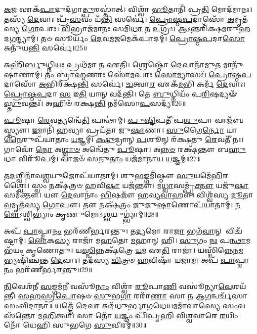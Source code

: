 \-\ul{𑌅}\-𑌜 𑌏𑌕᳴\-\ul{𑌪𑌾}\-𑌦𑍁𑌦᳴𑌗𑌾\-\ul{𑌤𑍍𑌪𑍁}\-𑌰𑌸𑍍𑌤𑌾॑𑌤𑍍। 
𑌵𑌿𑌶𑍍𑌵𑌾᳴ \ul{𑌭𑍂}\-𑌤𑌾𑌨𑌿᳴ 𑌪𑍍𑌰\-\ul{𑌤𑌿} 𑌮𑍋𑌦᳴𑌮𑌾𑌨𑌃। 
𑌤𑌸𑍍𑌯᳴ \ul{𑌦𑍇}\-𑌵𑌾𑌃 𑌪𑍍𑌰᳴\-\ul{𑌸}\-𑌵𑌂 𑌯᳴\-\ul{𑌨𑍍𑌤𑌿} 𑌸𑌰𑍍𑌵𑍇॑। 
\-\ul{𑌪𑍍𑌰𑍋}\-\-\ul{𑌷𑍍𑌠}\-\-\ul{𑌪}\-𑌦𑌾𑌸𑍋᳴ \ul{𑌅}\-𑌮𑍃𑌤᳴𑌸𑍍𑌯 \ul{𑌗𑍋}\-𑌪𑌾𑌃। 
\-\ul{𑌵𑌿}\-𑌭𑍍𑌰𑌾𑌜᳴𑌮𑌾𑌨𑌃 𑌸𑌮𑌿\-\ul{𑌧𑌾} 𑌨 \ul{𑌉}\-𑌗𑍍𑌰𑌃। 
𑌆𑌽𑌨𑍍𑌤𑌰𑌿᳴𑌕𑍍𑌷𑌮𑌰𑍁\-\ul{𑌹}\-𑌦\-\ul{𑌗}\-𑌨𑍍𑌦𑍍𑌯𑌾𑌮𑍍। 
𑌤𑍞 𑌸𑍂𑌰𑍍𑌯𑌂᳴ \ul{𑌦𑍇}\-𑌵\-\ul{𑌮}\-𑌜𑌮𑍇𑌕᳴𑌪𑌾𑌦𑌮𑍍। 
\-\ul{𑌪𑍍𑌰𑍋}\-\-\ul{𑌷𑍍𑌠}\-\-\ul{𑌪}\-𑌦𑌾\-\ul{𑌸𑍋} 𑌅𑌨𑍁᳴𑌯\-\ul{𑌨𑍍𑌤𑌿} 𑌸𑌰𑍍𑌵𑍇॑॥25॥ 

𑌅𑌹𑌿᳴\-\ul{𑌰𑍍𑌬𑍁}\-𑌧𑍍𑌨𑌿\-\ul{𑌯𑌃} 𑌪𑍍𑌰𑌥᳴𑌮𑌾 𑌨 𑌏𑌤𑌿। 
𑌶𑍍𑌰𑍇𑌷𑍍𑌠𑍋᳴ \ul{𑌦𑍇}\-𑌵𑌾𑌨𑌾᳴\-\ul{𑌮𑍁}\-𑌤 𑌮𑌾𑌨𑍁᳴𑌷𑌾𑌣𑌾𑌮𑍍। 
𑌤𑌂 𑌬𑍍𑌰𑌾॑\-\ul{𑌹𑍍𑌮}\-𑌣𑌾𑌃 𑌸𑍋᳴\-\ul{𑌮}\-𑌪𑌾𑌃 \ul{𑌸𑍋}\-𑌮𑍍𑌯𑌾𑌸𑌃᳴। 
\-\ul{𑌪𑍍𑌰𑍋}\-\-\ul{𑌷𑍍𑌠}\-\-\ul{𑌪}\-𑌦𑌾𑌸𑍋᳴ \ul{𑌅}\-𑌭𑌿𑌰᳴𑌕𑍍𑌷\-\ul{𑌨𑍍𑌤𑌿} 𑌸𑌰𑍍𑌵𑍇॑। 
\-\ul{𑌚}\-𑌤𑍍𑌵𑌾\-\ul{𑌰} 𑌏𑌕᳴\-\ul{𑌮}\-𑌭𑌿 𑌕𑌰𑍍𑌮᳴ \ul{𑌦𑍇}\-𑌵𑌾𑌃। 
\-\ul{𑌪𑍍𑌰𑍋}\-\-\ul{𑌷𑍍𑌠}\-\-\ul{𑌪}\-𑌦𑌾 \ul{𑌸} 𑌇\-\ul{𑌤𑌿} 𑌯𑌾𑌨𑍍 𑌵𑌦᳴𑌨𑍍𑌤𑌿। 
𑌤𑍇 \ul{𑌬𑍁}\-𑌧𑍍𑌨𑌿𑌯𑌂᳴ 𑌪\-\ul{𑌰𑌿}\-𑌷𑌦𑍍𑌯𑍟᳴ \ul{𑌸𑍍𑌤𑍁}\-𑌵𑌨𑍍𑌤𑌃᳴। 
𑌅𑌹𑌿𑍞᳴ 𑌰𑌕𑍍𑌷\-\ul{𑌨𑍍𑌤𑌿} 𑌨𑌮᳴𑌸𑍋\-\ul{𑌪}\-𑌸𑌦𑍍𑌯᳴॥26॥ 

\-\ul{𑌪𑍂}\-𑌷𑌾 \ul{𑌰𑍇}\-𑌵𑌤𑍍𑌯𑌨𑍍𑌵𑍇᳴\-\ul{𑌤𑌿} 𑌪𑌨𑍍𑌥𑌾॑𑌮𑍍। 
\-\ul{𑌪𑍁}\-\-\ul{𑌷𑍍𑌟𑌿}\-𑌪𑌤𑍀᳴ 𑌪\-\ul{𑌶𑍁}\-𑌪𑌾 𑌵𑌾𑌜᳴𑌬𑌸𑍍𑌤𑍍𑌯𑍗। 
\-\ul{𑌇}\-𑌮𑌾𑌨𑌿᳴ \ul{𑌹}\-𑌵𑍍𑌯𑌾 𑌪𑍍𑌰𑌯᳴𑌤𑌾 𑌜𑍁\-\ul{𑌷𑌾}\-𑌣𑌾। 
\-\ul{𑌸𑍁}\-𑌗𑍈\-\ul{𑌰𑍍𑌨𑍋} 𑌯𑌾\-\ul{𑌨𑍈}\-𑌰𑍁𑌪᳴𑌯𑌾𑌤𑌾𑌂 \ul{𑌯}\-𑌜𑍍𑌞𑌮𑍍। 
\-\ul{𑌕𑍍𑌷𑍁}\-𑌦𑍍𑌰𑌾𑌨𑍍 \ul{𑌪}\-𑌶𑍂𑌨𑍍 𑌰᳴𑌕𑍍𑌷𑌤𑍁 \ul{𑌰𑍇}\-𑌵𑌤𑍀᳴ 𑌨𑌃। 
𑌗𑌾𑌵𑍋᳴ \ul{𑌨𑍋} 𑌅\-\ul{𑌶𑍍𑌵𑌾}\-\-\ul{𑍞} 𑌅𑌨𑍍𑌵𑍇᳴𑌤𑍁 \ul{𑌪𑍂}\-𑌷𑌾। 
𑌅\-\ul{𑌨𑍍𑌨}\-\-\ul{𑍞} 𑌰𑌕𑍍𑌷᳴𑌨𑍍𑌤𑍗 𑌬\-\ul{𑌹𑍁}\-𑌧𑌾 𑌵𑌿𑌰𑍂᳴𑌪𑌮𑍍। 
𑌵𑌾𑌜𑍞᳴ 𑌸𑌨𑍁\-\ul{𑌤𑌾𑌂} 𑌯𑌜᳴𑌮𑌾𑌨𑌾𑌯 \ul{𑌯}\-𑌜𑍍𑌞𑌮𑍍॥27॥ 

𑌤\-\ul{𑌦}\-𑌶𑍍𑌵𑌿𑌨𑌾᳴𑌵\-\ul{𑌶𑍍𑌵}\-𑌯𑍁𑌜𑍋𑌪᳴𑌯𑌾𑌤𑌾𑌮𑍍। 
𑌶𑍁\-\ul{𑌭}\-𑌙𑍍𑌗𑌮𑌿᳴𑌷𑍍𑌠𑍗 \ul{𑌸𑍁}\-𑌯𑌮𑍇᳴\-\ul{𑌭𑌿}\-𑌰𑌶𑍍𑌵𑍈𑌃॑। 
𑌸𑍍𑌵𑌂 𑌨𑌕𑍍𑌷᳴𑌤𑍍𑌰𑍞 \ul{𑌹}\-𑌵𑌿\-\ul{𑌷𑌾} 𑌯𑌜᳴𑌨𑍍𑌤𑍗। 
𑌮\-\ul{𑌧𑍍𑌵𑌾}\-𑌸𑌮𑍍𑌪𑍃᳴\-\ul{𑌕𑍍𑌤𑍗} 𑌯𑌜𑍁᳴\-\ul{𑌷𑌾} 𑌸𑌮᳴𑌕𑍍𑌤𑍗। 
𑌯𑍗 \ul{𑌦𑍇}\-𑌵𑌾𑌨𑌾𑌂॑ \ul{𑌭𑌿}\-𑌷𑌜𑍗᳴ 𑌹𑌵𑍍𑌯\-\ul{𑌵𑌾}\-𑌹𑍗। 
𑌵𑌿𑌶𑍍𑌵᳴𑌸𑍍𑌯 \ul{𑌦𑍂}\-𑌤𑌾\-\ul{𑌵}\-𑌮𑍃𑌤᳴𑌸𑍍𑌯 \ul{𑌗𑍋}\-𑌪𑍗। 
𑌤𑍗 𑌨𑌕𑍍𑌷᳴𑌤𑍍𑌰𑌂 𑌜𑍁𑌜𑍁\-\ul{𑌷𑌾}\-𑌣𑍋𑌪᳴𑌯𑌾𑌤𑌾𑌮𑍍। 
𑌨\-\ul{𑌮𑍋}\-𑌽𑌶𑍍𑌵𑌿𑌭𑍍𑌯𑌾𑌂॑ 𑌕𑍃𑌣𑍁𑌮𑍋𑌽\-\ul{𑌶𑍍𑌵}\-𑌯𑍁𑌗𑍍𑌭𑍍𑌯𑌾॑𑌮𑍍॥28॥ 

𑌅𑌪᳴ \ul{𑌪𑌾}\-𑌪𑍍𑌮𑌾\-\ul{𑌨𑌂} 𑌭𑌰᳴𑌣𑍀𑌰𑍍𑌭𑌰𑌨𑍍𑌤𑍁। 
𑌤\-\ul{𑌦𑍍𑌯}\-𑌮𑍋 𑌰𑌾\-\ul{𑌜𑌾} 𑌭𑌗᳴\-\ul{𑌵𑌾}\-𑌨𑍍 𑌵𑌿𑌚᳴𑌷𑍍𑌟𑌾𑌮𑍍। 
\-\ul{𑌲𑍋}\-𑌕\-\ul{𑌸𑍍𑌯} 𑌰𑌾𑌜𑌾᳴ 𑌮\-\ul{𑌹}\-𑌤𑍋 \ul{𑌮}\-𑌹𑌾𑌨𑍍 𑌹𑌿। 
\-\ul{𑌸𑍁}\-𑌗𑌂 \ul{𑌨𑌃} 𑌪\-\ul{𑌨𑍍𑌥𑌾}\-𑌮𑌭᳴𑌯𑌂 𑌕𑍃𑌣𑍋𑌤𑍁। 
𑌯\-\ul{𑌸𑍍𑌮𑌿}\-𑌨𑍍𑌨𑌕𑍍𑌷᳴𑌤𑍍𑌰𑍇 \ul{𑌯}\-𑌮 𑌏\-\ul{𑌤𑌿} 𑌰𑌾𑌜𑌾॑। 
𑌯𑌸𑍍𑌮𑌿᳴𑌨𑍍𑌨𑍇𑌨\-\ul{𑌮}\-𑌭𑍍𑌯𑌷𑌿᳴𑌞𑍍𑌚𑌨𑍍𑌤 \ul{𑌦𑍇}\-𑌵𑌾𑌃। 
𑌤𑌦᳴𑌸𑍍𑌯 \ul{𑌚𑌿}\-𑌤𑍍𑌰𑍞 \ul{𑌹}\-𑌵𑌿𑌷𑌾᳴ 𑌯𑌜𑌾𑌮। 
𑌅𑌪᳴ \ul{𑌪𑌾}\-𑌪𑍍𑌮𑌾\-\ul{𑌨𑌂} 𑌭𑌰᳴𑌣𑍀𑌰𑍍𑌭𑌰𑌨𑍍𑌤𑍁॥29॥ 

\-\ul{𑌨𑌿}\-𑌵𑍇𑌶᳴𑌨𑍀 \ul{𑌸}\-𑌙𑍍𑌗𑌮᳴\-\ul{𑌨𑍀} 𑌵𑌸𑍂᳴\-\ul{𑌨𑌾𑌂} 𑌵𑌿𑌶𑍍𑌵𑌾᳴ \ul{𑌰𑍂}\-𑌪𑌾\-\ul{𑌣𑌿} 𑌵𑌸𑍂॑𑌨𑍍𑌯𑌾\-\ul{𑌵𑍇}\-𑌶𑌯᳴𑌨𑍍𑌤𑍀। 
\-\ul{𑌸}\-\-\ul{𑌹}\-\-\ul{𑌸𑍍𑌰}\-\-\ul{𑌪𑍋}\-𑌷𑍞 \ul{𑌸𑍁}\-𑌭\-\ul{𑌗𑌾} 𑌰𑌰𑌾᳴\-\ul{𑌣𑌾} 𑌸𑌾 \ul{𑌨} 𑌆\-\ul{𑌗}\-𑌨𑍍𑌵𑌰𑍍𑌚᳴𑌸𑌾 𑌸𑌂𑌵𑌿\-\ul{𑌦𑌾}\-𑌨𑌾॥ 𑌯𑌤𑍍𑌤𑍇᳴ \ul{𑌦𑍇}\-𑌵𑌾 𑌅𑌦᳴𑌧𑍁𑌰𑍍𑌭𑌾\-\ul{𑌗}\-𑌧𑍇\-\ul{𑌯}\-𑌮𑌮𑌾᳴𑌵𑌾𑌸𑍍𑌯𑍇 \ul{𑌸𑌂}\-𑌵𑌸᳴𑌨𑍍𑌤𑍋 𑌮\-\ul{𑌹𑌿}\-𑌤𑍍𑌵𑌾। 
𑌸𑌾 𑌨𑍋᳴ \ul{𑌯}\-𑌜𑍍𑌞𑌂 𑌪𑌿᳴𑌪𑍃𑌹𑌿 𑌵𑌿𑌶𑍍𑌵𑌵𑌾𑌰𑍇 \ul{𑌰}\-𑌯𑌿𑌂 𑌨𑍋᳴ 𑌧𑍇𑌹𑌿 𑌸𑍁𑌭𑌗𑍇 \ul{𑌸𑍁}\-𑌵𑍀𑌰𑌮𑍍॑॥30॥ 

